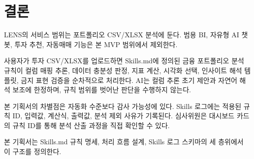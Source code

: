 \documentclass[10pt,a4paper]{article}
\begin{document}
\section{결론}\label{uxacb0uxb860}

LENS의 서비스 범위는 포트폴리오 CSV/XLSX 분석에 둔다. 범용 BI, 자유형 AI 챗봇, 투자 추천, 자동매매 기능은 본 MVP 범위에서 제외한다.

사용자가 투자 CSV/XLSX를 업로드하면 Skills.md에 정의된 금융 포트폴리오 분석 규칙이 컬럼 매핑 추론, 데이터 충분성 판정, 지표 계산, 시각화 선택, 인사이트 해석 템플릿, 금지 표현 검증을 순차적으로 처리한다. AI는 컬럼 추론 초기 제안과 자연어 해석 보조에 한정하며, 규칙 범위를 벗어난 판단을 수행하지 않는다.

본 기획서의 차별점은 자동화 수준보다 감사 가능성에 있다. Skills 로그에는 적용된 규칙 ID, 입력값, 계산식, 출력값, 분석 제외 사유가 기록된다. 심사위원은 대시보드 카드의 규칙 ID를 통해 분석 산출 과정을 직접 확인할 수 있다.

본 기획서는 Skills.md 규칙 명세, 처리 흐름 설계, Skills 로그 스키마의 세 층위에서 이 구조를 정의한다.
\end{document}

